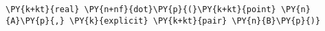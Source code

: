 \begin{Verbatim}[commandchars=\\\{\}]
    \PY{k+kt}{real} \PY{n+nf}{dot}\PY{p}{(}\PY{k+kt}{point} \PY{n}{A}\PY{p}{,} \PY{k}{explicit} \PY{k+kt}{pair} \PY{n}{B}\PY{p}{)}
\end{Verbatim}
